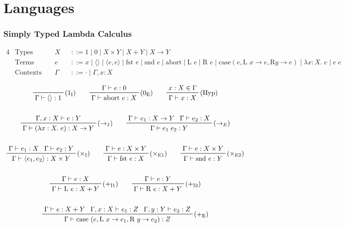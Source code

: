\documentclass[11pt]{article}
\begin{document}
\section{Languages}
{
    \subsubsection*{Simply Typed Lambda Calculus}
    {
        \begin{alignat*}{4}
        &\text{Types } &&X &&::= 1 \mid 0 \mid X \times Y \mid X + Y \mid X \rightarrow Y && \\
        &\text{Terms } &&e &&::= x \mid \langle\rangle \mid \langle e,e \rangle \mid \text{fst } e \mid \text{snd } e
        \mid \text{abort} \mid \text{L } e \mid \text{R } e \mid \text{case}(e,\text{L }x\rightarrow
        e,\text{R}y\rightarrow e) \mid \lambda x:X.\;e \mid e\;e && \\
        &\text{Contexts } &&\Gamma &&::= \cdot \mid \Gamma,x:X &&
        \end{alignat*}

        \begin{gather*}
        \prftree[r]{(\(1_\text{I}\))}
        {\Gamma\vdash\langle\rangle:1}
        \qquad
        \prftree[r]{(\(0_\text{E}\))}
        {\Gamma\vdash e : 0}
        {\Gamma\vdash\text{abort }e : X}
        \qquad
        \prftree[r]{(Hyp)}
        {x:X \in \Gamma}
        {\Gamma\vdash x : X}
        \\
        \\
        \prftree[r]{(\(\rightarrow_I\))}
        {\Gamma, x:X \vdash e : Y}
        {\Gamma\vdash (\lambda x:X.\;e) : X \rightarrow Y}
        \qquad
        \prftree[r]{(\(\rightarrow_E\))}
        {\Gamma\vdash e_1 : X \rightarrow Y}
        {\Gamma\vdash e_2 : X}
        {\Gamma\vdash e_1\;e_2 : Y}
        \\
        \\
        \prftree[r]{(\(\times_\text{I}\))}
        {\Gamma\vdash e_1 : X}
        {\Gamma\vdash e_2 : Y}
        {\Gamma\vdash\langle e_1,e_2 \rangle: X \times Y}
        \qquad
        \prftree[r]{(\(\times_\text{E1}\))}
        {\Gamma\vdash e : X \times Y}
        {\Gamma\vdash\text{fst }e : X}
        \qquad
        \prftree[r]{(\(\times_\text{E2}\))}
        {\Gamma\vdash e : X \times Y}
        {\Gamma\vdash\text{snd }e : Y}
        \\
        \\
        \prftree[r]{(\(+_\text{I1}\))}
        {\Gamma\vdash e : X}
        {\Gamma\vdash \text{L }e : X + Y}
        \qquad
        \prftree[r]{(\(+_\text{I2}\))}
        {\Gamma\vdash e : Y}
        {\Gamma\vdash \text{R }e : X + Y}
        \\
        \\
        \prftree[r]{(\(+_\text{E}\))}
        {\Gamma\vdash e : X + Y}
        {\Gamma,x:X\vdash e_1 : Z}
        {\Gamma,y:Y\vdash e_2 : Z}
        {\Gamma\vdash\text{case }(e, \text{L }x \rightarrow e_1,\text{R }y \rightarrow e_2) : Z}
        \end{gather*}

}}
\end{document}
